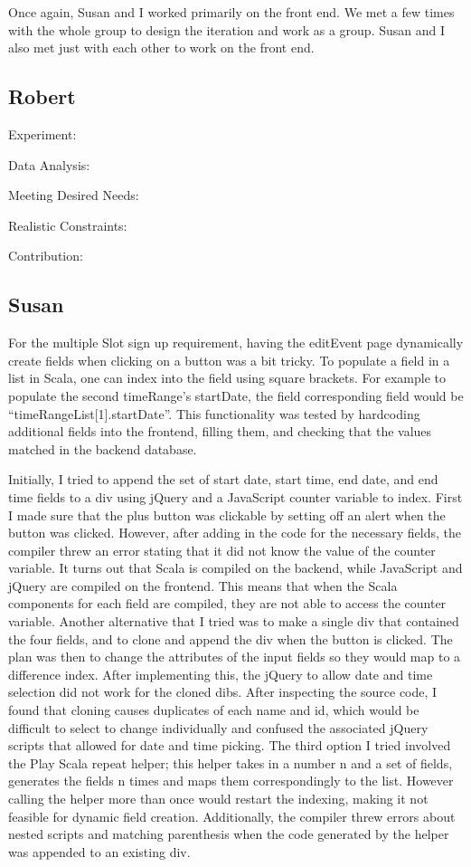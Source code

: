 \documentclass{article}
\begin{document}
Once again, Susan and I worked primarily on the front end.  We met a few times with the whole group to design the iteration and work as a group.  Susan and I also met just with each other to work on the front end.  


\subsection{Robert}
Experiment:

Data Analysis: 

Meeting Desired Needs: 

Realistic Constraints:

Contribution:


\subsection{Susan}
For the multiple Slot sign up requirement, having the editEvent page dynamically create fields when clicking on a button was a bit tricky. To populate a field in a list in Scala, one can index into the field using square brackets. For example to populate the second timeRange’s startDate, the field corresponding field would be “timeRangeList[1].startDate”. This functionality was tested by hardcoding additional fields into the frontend, filling them, and checking that the values matched in the backend database.

Initially, I tried to append the set of start date, start time, end date, and end time fields to a div using jQuery and a JavaScript counter variable to index. First I made sure that the plus button was clickable by setting off an alert when the button was clicked. However, after adding in the code for the necessary fields, the compiler threw an error stating that it did not know the value of the counter variable. It turns out that Scala is compiled on the backend, while JavaScript and jQuery are compiled on the frontend. This means that when the Scala components for each field are compiled, they are not able to access the counter variable. Another alternative that I tried was to make a single div that contained the four fields, and to clone and append the div when the button is clicked. The plan was then to change the attributes of the input fields so they would map to a difference index. After implementing this, the jQuery to allow date and time selection did not work for the cloned dibs. After inspecting the source code, I found that cloning causes duplicates of each name and id, which would be difficult to select to change individually and confused the associated jQuery scripts that allowed for date and time picking. The third option I tried involved the Play Scala repeat helper; this helper takes in a number n and a set of fields, generates the fields n times and maps them correspondingly to the list. However calling the helper more than once would restart the indexing, making it not feasible for dynamic field creation. Additionally, the compiler threw errors about nested scripts and matching parenthesis when the code generated by the helper was appended to an existing div.
\end{document}
